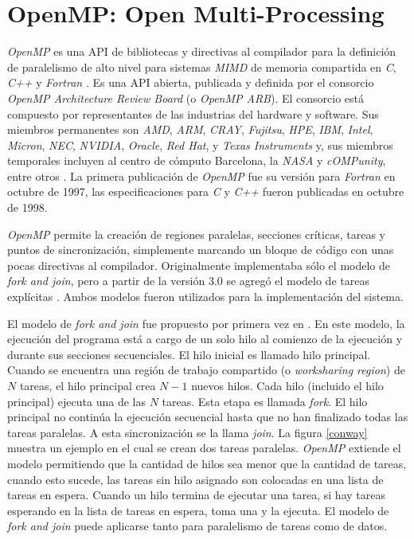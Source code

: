 
\section{OpenMP: Open Multi-Processing}

\label{mt_openmp}

\emph{OpenMP} es una API de bibliotecas y directivas al compilador para la
definición de paralelismo de alto nivel para sistemas \emph{MIMD} de memoria
compartida en \emph{C}, \emph{C++} y \emph{Fortran} \cite{ompWeb}. Es una API
abierta, publicada y definida por el consorcio \emph{OpenMP Architecture Review
Board} (o \emph{OpenMP ARB}). El consorcio está compuesto por representantes de
las industrias del hardware y software. Sus miembros permanentes son \emph{AMD},
\emph{ARM}, \emph{CRAY}, \emph{Fujitsu}, \emph{HPE}, \emph{IBM}, \emph{Intel},
\emph{Micron}, \emph{NEC}, \emph{NVIDIA}, \emph{Oracle}, \emph{Red Hat}, y
\emph{Texas Instruments} y, sus miembros temporales incluyen al centro de
cómputo Barcelona, la \emph{NASA} y \emph{cOMPunity}, entre otros \cite{ompWeb}.
La primera publicación de \emph{OpenMP} fue su versión para \emph{Fortran} en
octubre de 1997, las especificaciones para \emph{C} y \emph{C++} fueron
publicadas en octubre de 1998.

\emph{OpenMP} permite la creación de regiones paralelas, secciones críticas,
tareas y puntos de sincronización, simplemente marcando un bloque de código
con unas pocas directivas al compilador. Originalmente implementaba sólo el
modelo de \emph{fork and join}, pero a partir de la versión 3.0 se agregó el
modelo de tareas explícitas \cite{openmp08}. Ambos modelos fueron utilizados
para la implementación del sistema.

El modelo de \emph{fork and join} fue propuesto por primera vez en
\cite{conway1963}. En este modelo, la ejecución del programa está a cargo de un
solo hilo al comienzo de la ejecución y durante sus secciones secuenciales. El
hilo inicial es llamado hilo principal. Cuando se encuentra una región de
trabajo compartido (o \emph{worksharing region}) de $N$ tareas, el hilo
principal crea $N-1$ nuevos hilos. Cada hilo (incluido el hilo principal)
ejecuta una de las $N$ tareas. Esta etapa es llamada \emph{fork}. El hilo
principal no continúa la ejecución secuencial hasta que no han finalizado todas
las tareas paralelas. A esta sincronización se la llama \emph{join}. La figura
\ref{conway} muestra un ejemplo en el cual se crean dos tareas paralelas.
\emph{OpenMP} extiende el modelo permitiendo que la cantidad de hilos sea menor
que la cantidad de tareas, cuando esto sucede, las tareas sin hilo asignado son
colocadas en una lista de tareas en espera. Cuando un hilo termina de ejecutar
una tarea, si hay tareas esperando en la lista de tareas en espera, toma una y
la ejecuta. El modelo de \emph{fork and join} puede aplicarse tanto para
paralelismo de tareas como de datos.

